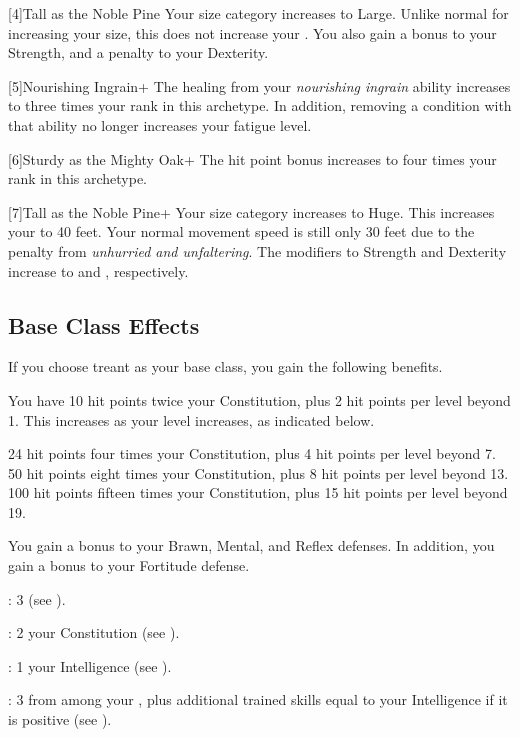     [4]{Tall as the Noble Pine} Your size category increases to Large.
      Unlike normal for increasing your size, this does not increase your .
      You also gain a  bonus to your Strength, and a  penalty to your Dexterity.

    [5]{Nourishing Ingrain+} The healing from your \textit{nourishing ingrain} ability increases to three times your rank in this archetype.
      In addition, removing a condition with that ability no longer increases your fatigue level.

    [6]{Sturdy as the Mighty Oak+} The hit point bonus increases to four times your rank in this archetype.

    [7]{Tall as the Noble Pine+} Your size category increases to Huge.
      This increases your  to 40 feet.
      Your normal movement speed is still only 30 feet due to the penalty from \textit{unhurried and unfaltering}.
      The modifiers to Strength and Dexterity increase to  and , respectively.

  \subsection{Base Class Effects}
    \veryhighhpprogressiontable

    If you choose treant as your base class, you gain the following benefits.

      You have 10 hit points \add twice your Constitution, plus 2 hit points per level beyond 1.
      This increases as your level increases, as indicated below.
      \begin{raggeditemize}
         24 hit points \add four times your Constitution, plus 4 hit points per level beyond 7.
         50 hit points \add eight times your Constitution, plus 8 hit points per level beyond 13.
         100 hit points \add fifteen times your Constitution, plus 15 hit points per level beyond 19.
      \end{raggeditemize}

      You gain a  bonus to your Brawn, Mental, and Reflex defenses.
      In addition, you gain a  bonus to your Fortitude defense.

      \begin{raggeditemize}
          \item {}: 3 (see ).
          \item {}: 2 \add your Constitution (see ).
          \item {}: 1 \add your Intelligence (see ).
          \item {}: 3 from among your , plus additional trained skills equal to your Intelligence if it is positive (see ).
      \end{raggeditemize}

